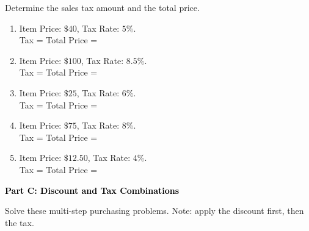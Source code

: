 \documentclass[12pt, letterpaper, fleqn]{article}
\newcommand{\blanklong}{\underline{\hspace{6.5cm}}}
\newcommand{\blankshorter}{\underline{\hspace{1.5cm}}}
\begin{document}
\vspace{3mm}

\noindent
Determine the sales tax amount and the total price.

\vspace{5mm}

\begin{enumerate}[itemsep=2.0cm, leftmargin=0.6cm]
\item Item Price: $\$40$, Tax Rate: $5\%$. \\
Tax = \blankshorter \quad Total Price = \blanklong

\item Item Price: $\$100$, Tax Rate: $8.5\%$. \\
Tax = \blankshorter \quad Total Price = \blanklong

\item Item Price: $\$25$, Tax Rate: $6\%$. \\
Tax = \blankshorter \quad Total Price = \blanklong

\item Item Price: $\$75$, Tax Rate: $8\%$. \\
Tax = \blankshorter \quad Total Price = \blanklong

\item Item Price: $\$12.50$, Tax Rate: $4\%$. \\
Tax = \blankshorter \quad Total Price = \blanklong
\end{enumerate}

\newpage

\begin{tcolorbox}[colback=black!10]
    \large\textcolor{black}{\textbf{Part C: Discount and Tax Combinations}}
\end{tcolorbox}

\vspace{3mm}

\noindent
Solve these multi-step purchasing problems. Note: apply the discount first, then the tax.

\vspace{5mm}
\end{document}
